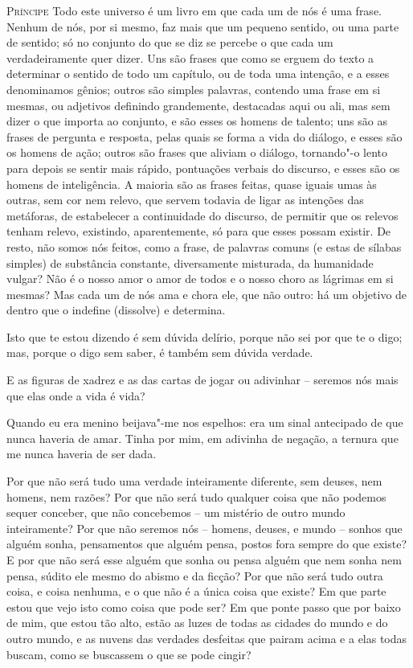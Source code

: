 \textsc{Príncipe} Todo este universo é um livro em que cada um de nós é
uma frase. Nenhum de nós, por si mesmo, faz mais que um pequeno
sentido, ou uma parte de sentido; só no conjunto do que se diz se
percebe o que cada um verdadeiramente quer dizer. Uns são frases que
como se erguem do texto a determinar o sentido de todo um capítulo,
ou de toda uma intenção, e a esses denominamos gênios; outros são
simples palavras, contendo uma frase em si mesmas, ou adjetivos
definindo grandemente, destacadas aqui ou ali, mas sem dizer o que
importa ao conjunto, e são esses os homens de talento; uns são as
frases de pergunta e resposta, pelas quais se forma a vida do
diálogo, e esses são os homens de ação; outros são frases que aliviam
o diálogo, tornando"-o lento para depois se sentir mais rápido,
pontuações verbais do discurso, e esses são os homens de
inteligência. A maioria são as frases feitas, quase iguais umas às
outras, sem cor nem relevo, que servem todavia de ligar as intenções
das metáforas, de estabelecer a continuidade do discurso, de permitir
que os relevos tenham relevo, existindo, aparentemente, só para que
esses possam existir. De resto, não somos nós feitos, como a frase,
de palavras comuns (e estas de sílabas simples) de substância
constante, diversamente misturada, da humanidade vulgar? Não é o
nosso amor o amor de todos e o nosso choro as lágrimas em si mesmas?
Mas cada um de nós ama e chora ele, que não outro: há um objetivo de
dentro que o indefine (dissolve) e determina.

Isto que te estou dizendo é sem dúvida delírio, porque não sei por que
te o digo; mas, porque o digo sem saber, é também sem dúvida verdade.

E as figuras de xadrez e as das cartas de jogar ou adivinhar -- seremos
nós mais que elas onde a vida é vida?

Quando eu era menino beijava"-me nos espelhos: era um sinal antecipado
de que nunca haveria de amar. Tinha por mim, em adivinha de negação,
a ternura que me nunca haveria de ser dada.

Por que não será tudo uma verdade inteiramente diferente, sem deuses,
nem homens, nem razões? Por que não será tudo qualquer coisa que não
podemos sequer conceber, que não concebemos -- um mistério de outro
mundo inteiramente? Por que não seremos nós -- homens, deuses, e mundo
-- sonhos que alguém sonha, pensamentos que alguém pensa, postos fora
sempre do que existe? E por que não será esse alguém que sonha ou
pensa alguém que nem sonha nem pensa, súdito ele mesmo do abismo e
da ficção? Por que não será tudo outra coisa, e coisa nenhuma, e o
que não é a única coisa que existe? Em que parte estou que vejo isto
como coisa que pode ser? Em que ponte passo que por baixo de mim, que
estou tão alto, estão as luzes de todas as cidades do mundo e do
outro mundo, e as nuvens das verdades desfeitas que pairam acima e a
elas todas buscam, como se buscassem o que se pode cingir?

